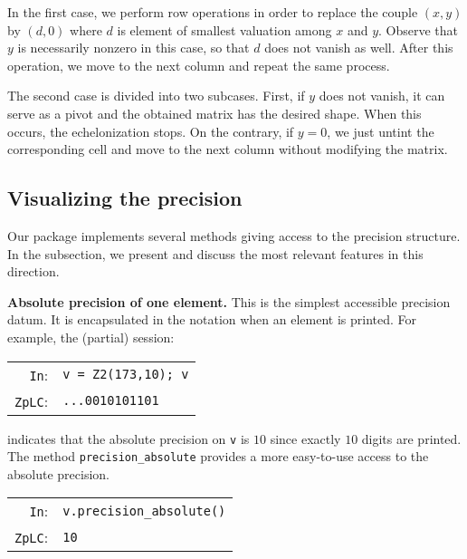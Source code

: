 \documentclass[sigconf]{acmart}
\newcommand{\ttv}{\texttt{v}\xspace}
\newcommand{\cIn}{{\color{input} \tt \phantom{Zp}In}:}
\newcommand{\cZpLC}{{\color{output} \tt ZpLC}:}
\theoremstyle{definition}
\begin{document}
\noindent

In the first case, we perform row operations in order to replace the 
couple $(x,y)$ by $(d, 0)$ where $d$ is element of smallest valuation 
among $x$ and $y$. Observe that $y$ is necessarily nonzero in this case, 
so that $d$ does not vanish as well. After this operation, we move to
the next column and repeat the same process.

The second case is divided into two subcases. First, if $y$ does not 
vanish, it can serve as a pivot and the obtained matrix has the desired 
shape. When this occurs, the echelonization stops. On the contrary, if 
$y = 0$, we just untint the corresponding cell and move to the next 
column without modifying the matrix.

\subsection{Visualizing the precision}
\label{ssec:viewprec}

Our package implements several methods giving access to the precision 
structure. In the subsection, we present and discuss the most relevant 
features in this direction.

\medskip

\noindent \textbf{Absolute precision of one element.}
%
This is the simplest accessible precision datum.
It is encapsulated in the notation when an element is printed. For
example, the (partial) session:

\smallskip

{\noindent \small
\noindent
\begin{tabular}{rl}
\cIn   & \verb?v = ?{\color{ring}\verb?Z2?}\verb?(173,10); v? \\
\cZpLC & \verb?...0010101101?
\end{tabular}}

\smallskip

\noindent
indicates that the absolute precision on \ttv is $10$ since
exactly $10$ digits are printed.
The method {\color{method}\verb?precision_absolute?} provides a more easy-to-use
access to the absolute precision.

\smallskip

{\noindent \small
\noindent
\begin{tabular}{rl}
\cIn   & \verb?v.?{\color{method}\verb?precision_absolute?}\verb?()? \\
\cZpLC & \verb?10?
\end{tabular}}
\end{document}
